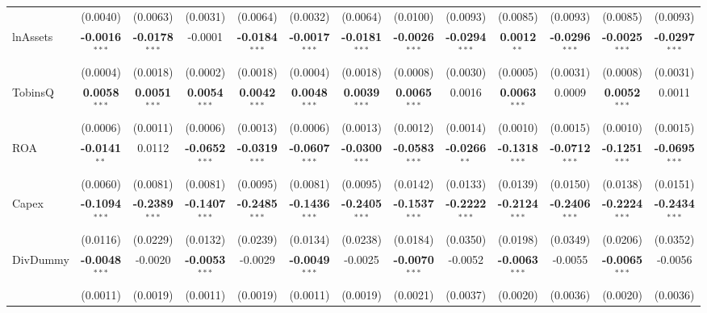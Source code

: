 \begin{landscape}
\begin{table}[H]
\begin{tabular}{lcccccccccccc}
 & (0.0040) & (0.0063) & (0.0031) & (0.0064) & (0.0032) & (0.0064) & (0.0100) & (0.0093) & (0.0085) & (0.0093) & (0.0085) & (0.0093) \\
lnAssets & \textbf{-0.0016}$^{***}$ & \textbf{-0.0178}$^{***}$ & -0.0001 & \textbf{-0.0184}$^{***}$ & \textbf{-0.0017}$^{***}$ & \textbf{-0.0181}$^{***}$ & \textbf{-0.0026}$^{***}$ & \textbf{-0.0294}$^{***}$ & \textbf{0.0012}$^{**}$ & \textbf{-0.0296}$^{***}$ & \textbf{-0.0025}$^{***}$ & \textbf{-0.0297}$^{***}$ \\
 & (0.0004) & (0.0018) & (0.0002) & (0.0018) & (0.0004) & (0.0018) & (0.0008) & (0.0030) & (0.0005) & (0.0031) & (0.0008) & (0.0031) \\
TobinsQ & \textbf{0.0058}$^{***}$ & \textbf{0.0051}$^{***}$ & \textbf{0.0054}$^{***}$ & \textbf{0.0042}$^{***}$ & \textbf{0.0048}$^{***}$ & \textbf{0.0039}$^{***}$ & \textbf{0.0065}$^{***}$ & 0.0016 & \textbf{0.0063}$^{***}$ & 0.0009 & \textbf{0.0052}$^{***}$ & 0.0011 \\
 & (0.0006) & (0.0011) & (0.0006) & (0.0013) & (0.0006) & (0.0013) & (0.0012) & (0.0014) & (0.0010) & (0.0015) & (0.0010) & (0.0015) \\
ROA & \textbf{-0.0141}$^{**}$ & 0.0112 & \textbf{-0.0652}$^{***}$ & \textbf{-0.0319}$^{***}$ & \textbf{-0.0607}$^{***}$ & \textbf{-0.0300}$^{***}$ & \textbf{-0.0583}$^{***}$ & \textbf{-0.0266}$^{**}$ & \textbf{-0.1318}$^{***}$ & \textbf{-0.0712}$^{***}$ & \textbf{-0.1251}$^{***}$ & \textbf{-0.0695}$^{***}$ \\
 & (0.0060) & (0.0081) & (0.0081) & (0.0095) & (0.0081) & (0.0095) & (0.0142) & (0.0133) & (0.0139) & (0.0150) & (0.0138) & (0.0151) \\
Capex & \textbf{-0.1094}$^{***}$ & \textbf{-0.2389}$^{***}$ & \textbf{-0.1407}$^{***}$ & \textbf{-0.2485}$^{***}$ & \textbf{-0.1436}$^{***}$ & \textbf{-0.2405}$^{***}$ & \textbf{-0.1537}$^{***}$ & \textbf{-0.2222}$^{***}$ & \textbf{-0.2124}$^{***}$ & \textbf{-0.2406}$^{***}$ & \textbf{-0.2224}$^{***}$ & \textbf{-0.2434}$^{***}$ \\
 & (0.0116) & (0.0229) & (0.0132) & (0.0239) & (0.0134) & (0.0238) & (0.0184) & (0.0350) & (0.0198) & (0.0349) & (0.0206) & (0.0352) \\
DivDummy & \textbf{-0.0048}$^{***}$ & -0.0020 & \textbf{-0.0053}$^{***}$ & -0.0029 & \textbf{-0.0049}$^{***}$ & -0.0025 & \textbf{-0.0070}$^{***}$ & -0.0052 & \textbf{-0.0063}$^{***}$ & -0.0055 & \textbf{-0.0065}$^{***}$ & -0.0056 \\
 & (0.0011) & (0.0019) & (0.0011) & (0.0019) & (0.0011) & (0.0019) & (0.0021) & (0.0037) & (0.0020) & (0.0036) & (0.0020) & (0.0036) \\

\end{tabular}
\end{table}
\end{landscape}
